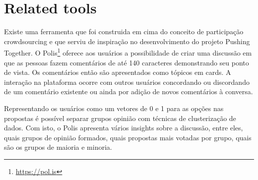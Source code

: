 \documentclass{llncs}
\begin{document}
\section{Related tools}

 Existe uma ferramenta que foi construida em cima do conceito de participação
 crowdsourcing e que serviu de inspiração no desenvolvimento do projeto Pushing
 Together. O Polis\footnote{\url{https://pol.is}} oferece aos usuários a possibilidade
 de criar uma discussão em que as pessoas fazem comentários de
 até 140 caracteres demonstrando seu ponto de vista. Os comentários então são
 apresentados como tópicos em cards. A interação na plataforma ocorre com outros
 usuários concordando ou discordando de um comentário existente ou ainda por
 adição de novos comentários à conversa.

 Representando os usuários como um vetores de 0 e 1 para as opções nas propostas
 é possível separar grupos opinião com técnicas de clusterização de dados.
 Com isto, o Polis apresenta vários insights sobre a discussão, entre eles, quais grupos de opinião formados, quais
 propostas mais votadas por grupo, quais são os grupos de maioria e minoria.

\end{document}
